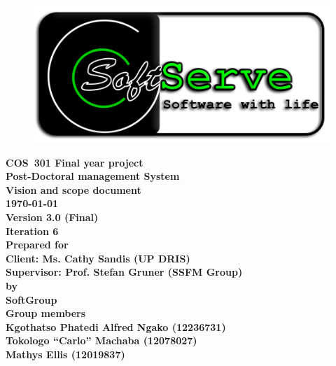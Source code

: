 \documentclass[12pt]{article}
\newcommand{\Title}{Vision and scope document} %
\newcommand{\Class}{COS\ 301 Final year project} %
\newcommand{\ssr}{Soft\color{green}{Serve }\color{black}}
\newcommand{\version}{3.0 (Final)}
\newcommand{\iteration}{6}
\newcommand{\client}{Ms. Cathy Sandis (UP DRIS)}
\newcommand{\supervisor}{Prof. Stefan Gruner (SSFM Group)}
\newcommand{\project}{Post-Doctoral management System}
\begin{document}
\vspace{4em}

\begin{center}%

\begin{figure}[ht!]
\centering
\includegraphics{../Images_Docs/logo.png}
\end{figure}
\LARGE \bf \Class \\[0.25em]
\LARGE \bf \project \\[1em]
\LARGE \bf \Title \\[0.25em]
\large \bf \today\\
\bf Version \version\\
\bf Iteration \iteration\\[0.5em]
\Large \bf Prepared for \\Client: \client\\Supervisor: \supervisor
\Large \\\bf by \\
\Large {\bf \ssr Group }\\[0.5em]
\LARGE {\bf Group members}\\[0.25em]
\large
Kgothatso Phatedi Alfred Ngako (12236731) \\[0.5em]
Tokologo “Carlo” Machaba (12078027) \\[0.5em]
Mathys Ellis (12019837) \\[8em]

\end{center}%

\end{document}
